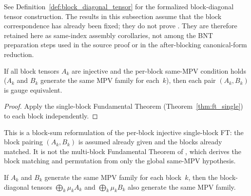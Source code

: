 \begin{remark}
    See Definition~\ref{def:block_diagonal_tensor} for the formalized
    block-diagonal tensor construction. The results in this subsection assume
    that the block correspondence has already been fixed; they do not prove
    \cite[Theorem~2.10]{Cirac2016MPDO_arXiv}. They are therefore retained
    here as same-index assembly corollaries, not among the BNT preparation
    steps used in the source proof or in the after-blocking canonical-form
    reduction.
\end{remark}

\begin{lemma}\label{lem:multi_block_ft}
    \leanok
    If all block tensors $A_k$ are injective and the per-block
    same-MPV condition holds ($A_k$ and $B_k$ generate the same
    MPV family for each~$k$),
    then each pair $(A_k, B_k)$ is gauge equivalent.
\end{lemma}

\begin{proof}
    \leanok
    Apply the single-block Fundamental Theorem
    (Theorem~\ref{thm:ft_single}) to each block independently.
\end{proof}

\begin{remark}
    This is a block-sum reformulation of the per-block injective single-block FT:
    the block pairing $(A_k, B_k)$ is assumed already given and the blocks already
    matched. It is not the multi-block Fundamental Theorem of
    \cite[Theorem~2.10, lines~349--352]{Cirac2016MPDO_arXiv}, which derives the
    block matching and permutation from only the global same-MPV hypothesis.
\end{remark}

\begin{lemma}\label{lem:block_to_global_mpv}
    \leanok
    If $A_k$ and $B_k$ generate the same MPV family for each
    block~$k$, then the block-diagonal tensors
    $\bigoplus_k \mu_k A_k$ and $\bigoplus_k \mu_k B_k$
    also generate the same MPV family.
\end{lemma}

